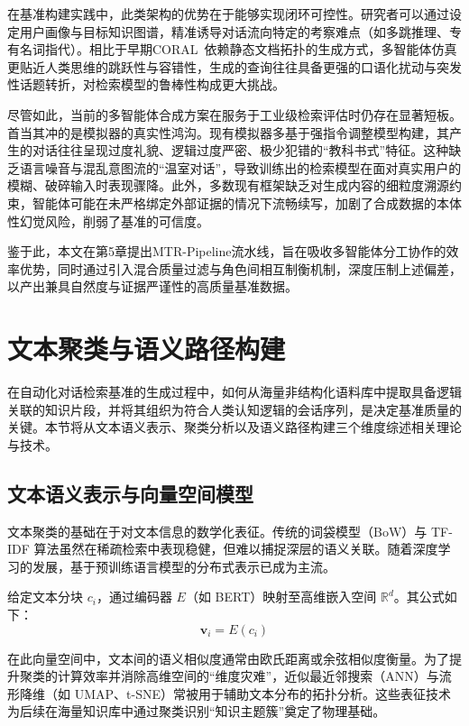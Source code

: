 在基准构建实践中，此类架构的优势在于能够实现闭环可控性。研究者可以通过设定用户画像与目标知识图谱，精准诱导对话流向特定的考察难点（如多跳推理、专有名词指代）。相比于早期CORAL~\citep{coral2025}依赖静态文档拓扑的生成方式，多智能体仿真更贴近人类思维的跳跃性与容错性，生成的查询往往具备更强的口语化扰动与突发性话题转折，对检索模型的鲁棒性构成更大挑战。

尽管如此，当前的多智能体合成方案在服务于工业级检索评估时仍存在显著短板。首当其冲的是模拟器的真实性鸿沟。现有模拟器多基于强指令调整模型构建，其产生的对话往往呈现过度礼貌、逻辑过度严密、极少犯错的“教科书式”特征。这种缺乏语言噪音与混乱意图流的“温室对话”，导致训练出的检索模型在面对真实用户的模糊、破碎输入时表现骤降。此外，多数现有框架缺乏对生成内容的细粒度溯源约束，智能体可能在未严格绑定外部证据的情况下流畅续写，加剧了合成数据的本体性幻觉风险，削弱了基准的可信度。

鉴于此，本文在第5章提出MTR-Pipeline流水线，旨在吸收多智能体分工协作的效率优势，同时通过引入混合质量过滤与角色间相互制衡机制，深度压制上述偏差，以产出兼具自然度与证据严谨性的高质量基准数据。



\section{文本聚类与语义路径构建}

在自动化对话检索基准的生成过程中，如何从海量非结构化语料库中提取具备逻辑关联的知识片段，并将其组织为符合人类认知逻辑的会话序列，是决定基准质量的关键。本节将从文本语义表示、聚类分析以及语义路径构建三个维度综述相关理论与技术。

\subsection{文本语义表示与向量空间模型}

文本聚类的基础在于对文本信息的数学化表征。传统的词袋模型（BoW）与 TF-IDF 算法虽然在稀疏检索中表现稳健，但难以捕捉深层的语义关联。随着深度学习的发展，基于预训练语言模型的分布式表示已成为主流。

给定文本分块 $c_i$，通过编码器 $E$（如 BERT）映射至高维嵌入空间 $\mathbb{R}^d$。其公式如下：
\begin{equation}
    \mathbf{v}_i = E(c_i)
\end{equation}

在此向量空间中，文本间的语义相似度通常由欧氏距离或余弦相似度衡量。为了提升聚类的计算效率并消除高维空间的“维度灾难”，近似最近邻搜索（ANN）与流形降维（如 UMAP、t-SNE）常被用于辅助文本分布的拓扑分析。这些表征技术为后续在海量知识库中通过聚类识别“知识主题簇”奠定了物理基础。

